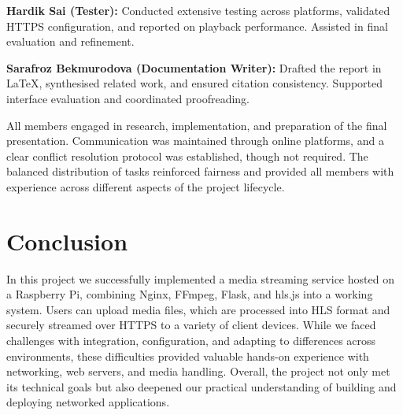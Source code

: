 \documentclass[11pt]{article}
\begin{document}
\textbf{Hardik Sai (Tester):} Conducted extensive testing across platforms, validated HTTPS configuration, and reported on playback performance. Assisted in final evaluation and refinement.

\textbf{Sarafroz Bekmurodova (Documentation Writer):} Drafted the report in LaTeX, synthesised related work, and ensured citation consistency. Supported interface evaluation and coordinated proofreading.

All members engaged in research, implementation, and preparation of the final presentation. Communication was maintained through online platforms, and a clear conflict resolution protocol was established, though not required. The balanced distribution of tasks reinforced fairness and provided all members with experience across different aspects of the project lifecycle.
\newpage
\section{Conclusion}
In this project we successfully implemented a media streaming service hosted on a Raspberry Pi, combining Nginx, FFmpeg, Flask, and hls.js into a working system. Users can upload media files, which are processed into HLS format and securely streamed over HTTPS to a variety of client devices. While we faced challenges with integration, configuration, and adapting to differences across environments, these difficulties provided valuable hands-on experience with networking, web servers, and media handling. Overall, the project not only met its technical goals but also deepened our practical understanding of building and deploying networked applications.
\newpage
\end{document}
